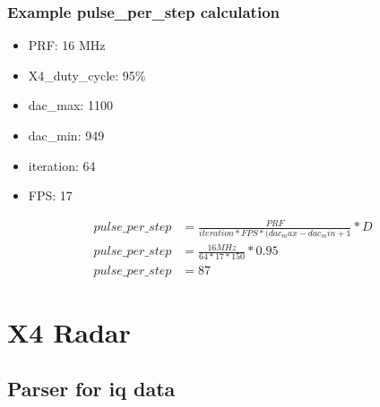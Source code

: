 \documentclass[letterpaper,10pt,english]{sphinxmanual}
\begin{document}
\subsubsection{Example pulse\_per\_step calculation}
\label{\detokenize{radar information:example-pulse-per-step-calculation}}\begin{itemize}
\item {} 
PRF: 16 MHz

\item {} 
X4\_duty\_cycle: 95\%

\item {} 
dac\_max: 1100

\item {} 
dac\_min: 949

\item {} 
iteration: 64

\item {} 
FPS: 17

\end{itemize}
\begin{equation*}
\begin{split}pulse\_per\_step &= \frac{PRF}{iteration*FPS*(dac_max-dac_min+1} * D \\
pulse\_per\_step  &= \frac{16 MHz}{64*17*150} * 0.95 \\
pulse\_per\_step  &= 87\end{split}
\end{equation*}

\section{X4 Radar}
\label{\detokenize{X4 radar:x4-radar}}\label{\detokenize{X4 radar::doc}}

\subsection{Parser for iq data}
\label{\detokenize{X4 radar:module-X4_parser}}\label{\detokenize{X4 radar:parser-for-iq-data}}
\end{document}
